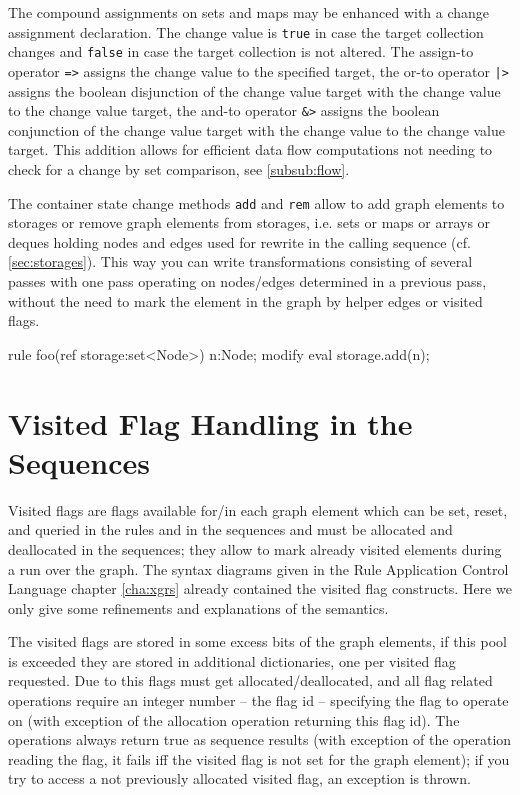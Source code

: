The compound assignments on sets and maps may be enhanced with a change assignment declaration.
The change value is \texttt{true} in case the target collection changes and \texttt{false} in case the target collection is not altered.
The assign-to operator \verb#=># assigns the change value to the specified target, the or-to operator \verb#|># assigns the boolean disjunction of the change value target with the change value to the change value target, the and-to operator \verb#&># assigns the boolean conjunction of the change value target with the change value to the change value target.
This addition allows for efficient data flow computations not needing to check for a change by set comparison, see \ref{subsub:flow}.


\begin{example}
The container state change methods \texttt{add} and \texttt{rem} allow to add graph elements to storages or remove graph elements from storages, i.e. sets or maps or arrays or deques holding nodes and edges used for rewrite in the calling sequence (cf. \ref{sec:storages}).
This way you can write transformations consisting of several passes with one pass operating on nodes/edges determined in a previous pass,
without the need to mark the element in the graph by helper edges or visited flags.
	\begin{grgen}
rule foo(ref storage:set<Node>)
{
  n:Node;
  modify {
    eval {
      storage.add(n);
    }
  }
}
	\end{grgen}
\end{example}



\section{Visited Flag Handling in the Sequences}\label{sec:visited}

Visited flags are flags available for/in each graph element which can be set, reset, and queried in the rules and in the sequences and must be allocated and deallocated in the sequences;
they allow to mark already visited elements during a run over the graph.
The syntax diagrams given in the Rule Application Control Language chapter \ref{cha:xgrs} already contained the visited flag constructs.
Here we only give some refinements and explanations of the semantics.

The visited flags are stored in some excess bits of the graph elements, if this pool is exceeded they are stored in additional dictionaries, one per visited flag requested.
Due to this flags must get allocated/deallocated, and all flag related operations require an integer number -- the flag id -- specifying the flag to operate on (with exception of the allocation operation returning this flag id).
The operations always return true as sequence results (with exception of the operation reading the flag, it fails iff the visited flag is not set for the graph element);
if you try to access a not previously allocated visited flag, an exception is thrown.

